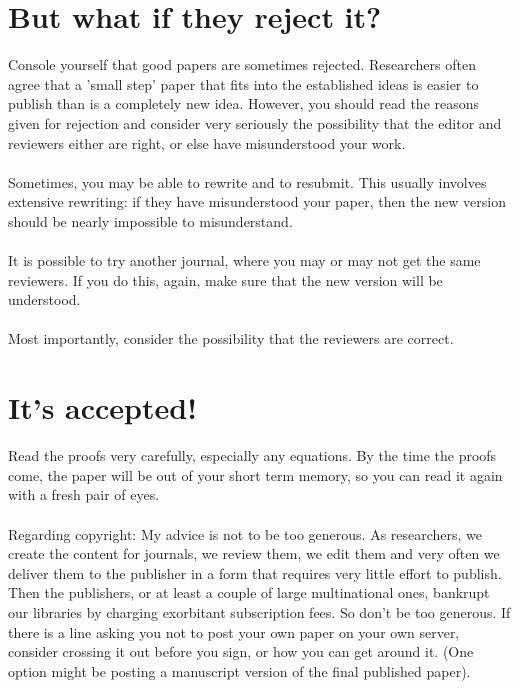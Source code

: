 \documentclass[a4paper,12pt]{article}
\begin{document}
\section{But what if they reject it?}
Console yourself that good papers are sometimes rejected. Researchers often agree that a 'small step' paper that fits into the established ideas is easier to publish than is a completely new idea. However, you should read the reasons given for rejection and consider very seriously the possibility that the editor and reviewers either are right, or else have misunderstood your work.\\\\Sometimes, you may be able to rewrite and to resubmit. This usually involves extensive rewriting: if they have misunderstood your paper, then the new version should be nearly impossible to misunderstand.\\\\It is possible to try another journal, where you may or may not get the same reviewers. If you do this, again, make sure that the new version will be understood.\\\\Most importantly, consider the possibility that the reviewers are correct.
\section{It's accepted!}
Read the proofs very carefully, especially any equations. By the time the proofs come, the paper will be out of your short term memory, so you can read it again with a fresh pair of eyes.\\\\Regarding copyright: My advice is not to be too generous. As researchers, we create the content for journals, we review them, we edit them and very often we deliver them to the publisher in a form that requires very little effort to publish. Then the publishers, or at least a couple of large multinational ones, bankrupt our libraries by charging exorbitant subscription fees. So don’t be too generous. If there is a line asking you not to post your own paper on your own server, consider crossing it out before you sign, or how you can get around it. (One option might be posting a manuscript version of the final published paper). 
\end{document}
